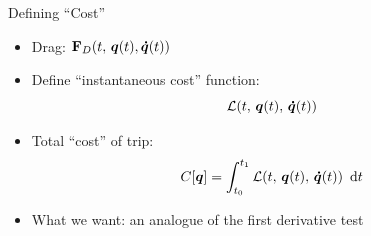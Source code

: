 \documentclass{fkpresentation}
\begin{document}
\begin{frame}{Defining ``Cost''}
  \begin{itemize}
    \item Drag: $\mathbf{F}_D(t,\, \bm q(t), \bm{\dot{q}}(t))$
    \item Define ``instantaneous cost'' function:
      \[
        \mathcal{L}(t,\, \bm q(t),\, \bm{\dot q}(t))
      \]
    \item Total ``cost'' of trip:
      \[
        C[\bm q] = \int_{t_0}^{t_1} \mathcal{L}(t,\, \bm q(t),\, \bm{\dot q}(t))
        \mathop{}\,\mathrm{d} t
      \]
    \item What we want: an analogue of the first derivative test
  \end{itemize}
\end{frame}




\end{document}
